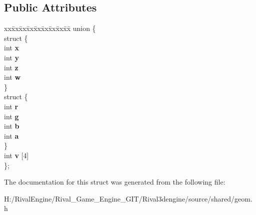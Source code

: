 \subsection*{Public Attributes}
\begin{DoxyCompactItemize}
\item 
\mbox{\label{structivec4_a14e3d6d1ee396248ed416e7104fac6c0}} 
\begin{tabbing}
xx\=xx\=xx\=xx\=xx\=xx\=xx\=xx\=xx\=\kill
union \{\\
\mbox{\label{unionivec4_1_1_0D195_ae56c3933d94104ca5c1973e3b8afc25e}} 
\>struct \{\\
\>\>int {\bfseries x}\\
\>\>int {\bfseries y}\\
\>\>int {\bfseries z}\\
\>\>int {\bfseries w}\\
\>\} \\
\mbox{\label{unionivec4_1_1_0D195_a28a584e318552cb99aa1f7acdaafdcb9}} 
\>struct \{\\
\>\>int {\bfseries r}\\
\>\>int {\bfseries g}\\
\>\>int {\bfseries b}\\
\>\>int {\bfseries a}\\
\>\} \\
\>int {\bfseries v} \mbox{[}4\mbox{]}\\
\}; \\

\end{tabbing}\end{DoxyCompactItemize}


The documentation for this struct was generated from the following file\+:\begin{DoxyCompactItemize}
\item 
H\+:/\+Rival\+Engine/\+Rival\+\_\+\+Game\+\_\+\+Engine\+\_\+\+G\+I\+T/\+Rival3dengine/source/shared/geom.\+h\end{DoxyCompactItemize}
